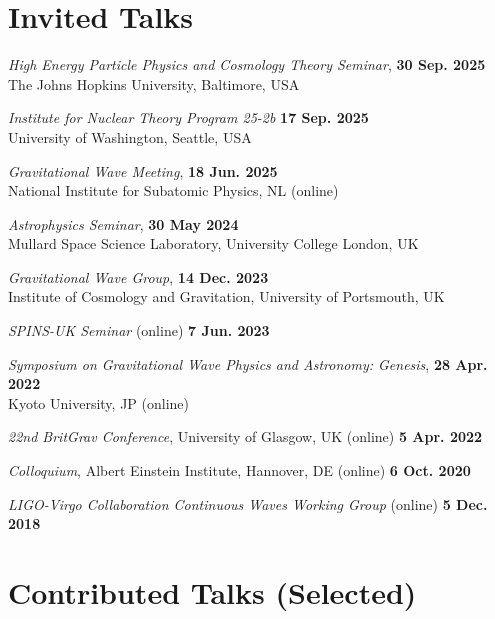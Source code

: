 \newcommand{\playsymbol}{$\blacktriangleright$}

\section{Invited Talks}

\secstartswithlist{}%
\begin{etaremune}
    \item \textit{High Energy Particle Physics and Cosmology Theory Seminar},
    \hfill \textbf{30 Sep. 2025} \\
    The Johns Hopkins University, Baltimore, USA
    \item \textit{Institute for Nuclear Theory Program 25-2b}
    \hfill \textbf{17 Sep. 2025} \\
    University of Washington, Seattle, USA
    \item \textit{Gravitational Wave Meeting}, \hfill \textbf{18 Jun. 2025} \\
    National Institute for Subatomic Physics, NL (online)
    \item \textit{Astrophysics Seminar}, \hfill \textbf{30 May 2024} \\
    Mullard Space Science Laboratory, University College London, UK
    \item \textit{Gravitational Wave Group}, \hfill \textbf{14 Dec. 2023} \\
    Institute of Cosmology and Gravitation, University of Portsmouth, UK
    \item \textit{SPINS-UK Seminar} (online) \hfill \textbf{7 Jun. 2023}
    \item
    \textit{Symposium on Gravitational Wave Physics and Astronomy: Genesis},
    \hfill \textbf{28 Apr. 2022} \\
    Kyoto University, JP (online)
    \item \textit{22nd BritGrav Conference}, University of Glasgow, UK (online)
    \hfill \textbf{5 Apr. 2022}
    \item \textit{Colloquium}, Albert Einstein Institute, Hannover, DE (online)
    \hfill \textbf{6 Oct. 2020}
    \item \textit{LIGO-Virgo Collaboration Continuous Waves Working Group}
    (online) \hfill \textbf{5 Dec. 2018}
\end{etaremune}

\section{Contributed Talks (Selected)}

